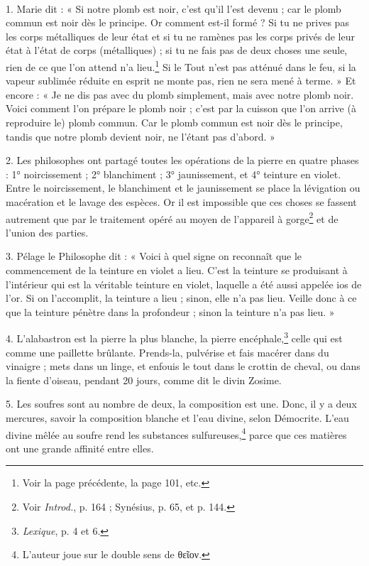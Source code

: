 \documentclass[a4paper, 11pt, oneside, polutonikogreek, french]{article}
\begin{document}
\paragraph{}
1. Marie dit : « Si notre plomb est noir, c'est qu'il l'est devenu ; car le plomb commun est noir dès le principe. Or comment est-il formé ? Si tu ne prives pas les corps métalliques de leur état et si tu ne ramènes pas les corps privés de leur état à l'état de corps (métalliques) ; si tu ne fais pas de deux choses une seule, rien de ce que l'on attend n'a lieu.\footnote{Voir la page précédente, la page 101, etc.} Si le Tout n'est pas atténué dans le feu, si la vapeur sublimée réduite en esprit ne monte pas, rien ne sera mené à terme. » Et encore : « Je ne dis pas avec du plomb simplement, mais avec notre plomb noir. Voici comment l'on prépare le plomb noir ; c'est par la cuisson que l'on arrive (à reproduire le) plomb commun. Car le plomb commun est noir dès le principe, tandis que notre plomb devient noir, ne l'étant pas d'abord. »

2. Les philosophes ont partagé toutes les opérations de la pierre en quatre phases : 1° noircissement ; 2° blanchiment ; 3° jaunissement, et 4° teinture en violet. Entre le noircissement, le blanchiment et le jaunissement se place la lévigation ou macération et le lavage des espèces. Or il est impossible que ces choses se fassent autrement que par le traitement opéré au moyen de l'appareil à gorge\footnote{Voir \emph{Introd.}, p. 164 ; Synésius, p. 65, et p. 144.} et de l'union des parties.

3. Pélage le Philosophe dit : « Voici à quel signe on reconnaît que le commencement de la teinture en violet a lieu. C'est la teinture se produisant à l'intérieur qui est la véritable teinture en violet, laquelle a été aussi appelée ios de l'or. Si on l'accomplit, la teinture a lieu ; sinon, elle n'a pas lieu. Veille donc à ce que la teinture pénètre dans la profondeur ; sinon la teinture n'a pas lieu. »

4. L'alabastron est la pierre la plus blanche, la pierre encéphale,\footnote{\emph{Lexique}, p. 4 et 6.} celle qui est comme une paillette brûlante. Prends-la, pulvérise et fais macérer dans du vinaigre ; mets dans un linge, et enfouis le tout dans le crottin de cheval, ou dans la fiente d'oiseau, pendant 20 jours, comme dit le divin Zosime.

5. Les soufres sont au nombre de deux, la composition est une. Donc, il y a deux mercures, savoir la composition blanche et l'eau divine, selon Démocrite. L'eau divine mêlée au soufre rend les substances sulfureuses,\footnote{L'auteur joue sur le double sens de θεῖον.} parce que ces matières ont une grande affinité entre elles.
\end{document}
